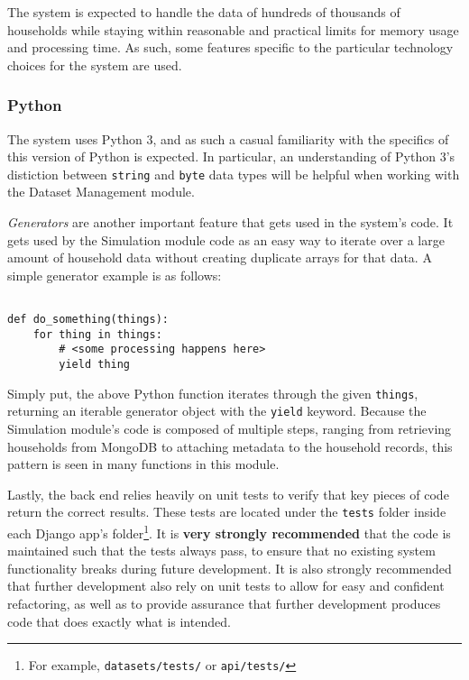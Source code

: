 The system is expected to handle the data of hundreds of thousands of households while staying within reasonable and practical limits for memory usage and processing time. As such, some features specific to the particular technology choices for the system are used.


\subsubsection{Python}

The system uses Python 3, and as such a casual familiarity with the specifics of this version of Python is expected. In particular, an understanding of Python 3's distiction between \texttt{string} and \texttt{byte} data types will be helpful when working with the Dataset Management module.

\emph{Generators} are another important feature that gets used in the system's code. It gets used by the Simulation module code as an easy way to iterate over a large amount of household data without creating duplicate arrays for that data. A simple generator example is as follows:

\begin{lstlisting}

def do_something(things):
    for thing in things:
        # <some processing happens here>
        yield thing

\end{lstlisting}

Simply put, the above Python function iterates through the given \texttt{things}, returning an iterable generator object with the \texttt{yield} keyword. Because the Simulation module's code is composed of multiple steps, ranging from retrieving households from MongoDB to attaching metadata to the household records, this pattern is seen in many functions in this module.

Lastly, the back end relies heavily on unit tests to verify that key pieces of code return the correct results. These tests are located under the \texttt{tests} folder inside each Django app's folder\footnote{For example, \texttt{datasets/tests/} or \texttt{api/tests/}}. It is \textbf{very strongly recommended} that the code is maintained such that the tests always pass, to ensure that no existing system functionality breaks during future development. It is also strongly recommended that further development also rely on unit tests to allow for easy and confident refactoring, as well as to provide assurance that further development produces code that does exactly what is intended.


